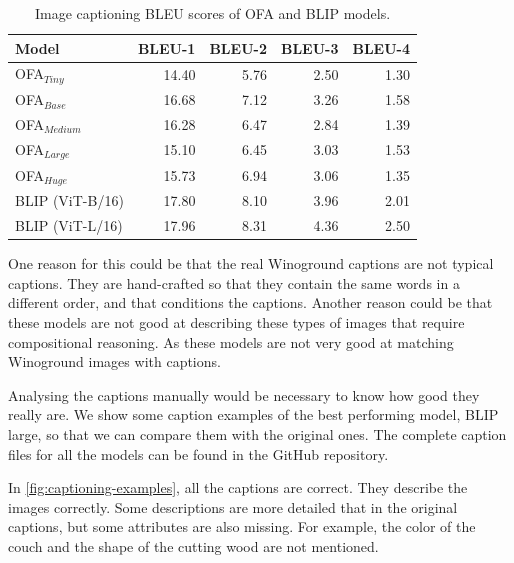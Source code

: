 \begin{table}[ht]
    \centering
    \begin{tabular}{lrrrr}
    \toprule
    Model &  BLEU-1 &  BLEU-2 &  BLEU-3 &  BLEU-4 \\
    \midrule
    OFA$_{Tiny}$    &   14.40 &    5.76 &    2.50 &    1.30 \\
    OFA$_{Base}$    &   16.68 &    7.12 &    3.26 &    1.58 \\
    OFA$_{Medium}$  &   16.28 &    6.47 &    2.84 &    1.39 \\
    OFA$_{Large}$   &   15.10 &    6.45 &    3.03 &    1.53 \\
    OFA$_{Huge}$    &   15.73 &    6.94 &    3.06 &    1.35 \\
    BLIP (ViT-B/16) &   17.80 &    8.10 &    3.96 &    2.01 \\
    BLIP (ViT-L/16) &   17.96 &    8.31 &    4.36 &    2.50 \\
    \bottomrule
    \end{tabular}
    \caption{Image captioning BLEU scores of OFA and BLIP models.}
    \label{tab:bleu_scores}
\end{table}

One reason for this could be that the real Winoground captions are not typical captions. They are hand-crafted so that they contain the same words in a different order, and that conditions the captions. Another reason could be that these models are not good at describing these types of images that require compositional reasoning. As these models are not very good at matching Winoground images with captions.

Analysing the captions manually would be necessary to know how good they really are. We show some caption examples of the best performing model, BLIP large, so that we can compare them with the original ones. The complete caption files for all the models can be found in the GitHub repository.

In \cref{fig:captioning-examples}, all the captions are correct. They describe the images correctly. Some descriptions are more detailed that in the original captions, but some attributes are also missing. For example, the color of the couch and the shape of the cutting wood are not mentioned.

